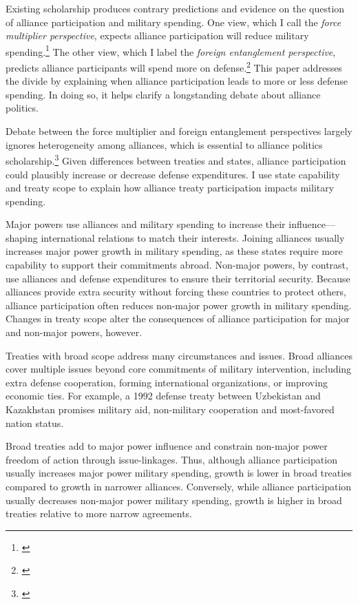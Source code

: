 \documentclass[12pt]{article}
\begin{document}
Existing scholarship produces contrary predictions and evidence on the question of alliance participation and military spending. 
One view, which I call the \textit{force multiplier perspective}, expects alliance participation will reduce military spending.\footnote{\cite{Morrow1993, Conybeare1994, DigiuseppePoast2016}} 
The other view, which I label the \textit{foreign entanglement perspective}, predicts alliance participants will spend more on defense.\footnote{\cite{Diehl1994, MorganPalmer2006}}
This paper addresses the divide by explaining when alliance participation leads to more or less defense spending. 
In doing so, it helps clarify a longstanding debate about alliance politics.


Debate between the force multiplier and foreign entanglement perspectives largely ignores heterogeneity among alliances, which is essential to alliance politics scholarship.\footnote{\cite{Morrow1991, Leeds2003, LeedsAnac2005, Fordham2010, Mattes2012, Benson2012, Poast2013, Johnsonetal2015}}  
Given differences between treaties and states, alliance participation could plausibly increase or decrease defense expenditures. 
I use state capability and treaty scope to explain how alliance treaty participation impacts military spending. 


Major powers use alliances and military spending to increase their influence--- shaping international relations to match their interests.
Joining alliances usually increases major power growth in military spending, as these states require more capability to support their commitments abroad. 
Non-major powers, by contrast, use alliances and defense expenditures to ensure their territorial security.
Because alliances provide extra security without forcing these countries to protect others, alliance participation often reduces non-major power growth in military spending. 
Changes in treaty scope alter the consequences of alliance participation for major and non-major powers, however. 


Treaties with broad scope address many circumstances and issues.
Broad alliances cover multiple issues beyond core commitments of military intervention, including extra defense cooperation, forming international organizations, or improving economic ties.  
For example, a 1992 defense treaty between Uzbekistan and Kazakhstan promises military aid, non-military cooperation and most-favored nation status. 


Broad treaties add to major power influence and constrain non-major power freedom of action through issue-linkages. 
Thus, although alliance participation usually increases major power military spending, growth is lower in broad treaties compared to growth in narrower alliances.  
Conversely, while alliance participation usually decreases non-major power military spending, growth is higher in broad treaties relative to more narrow agreements.
\end{document}
